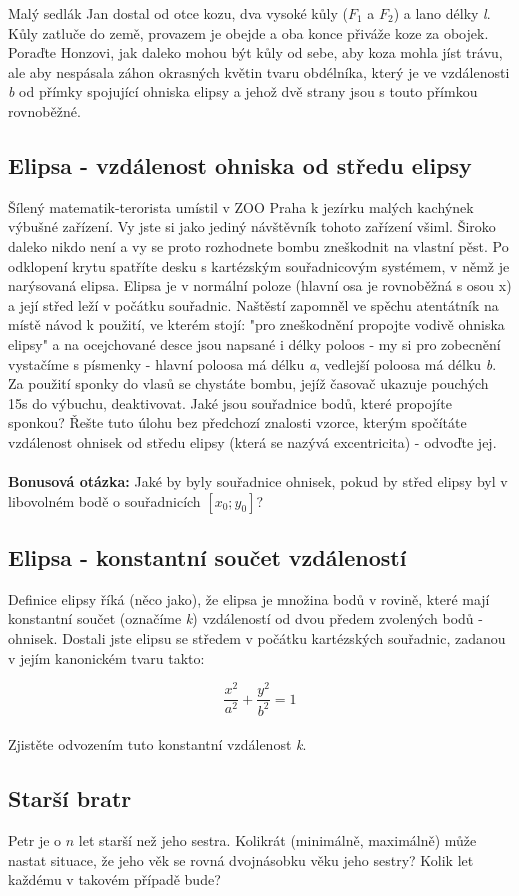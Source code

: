 \documentclass[a4paper,12pt]{article}
\begin{document}
Malý sedlák Jan dostal od otce kozu, dva vysoké kůly ($ F_1$ a $F_2 $) a lano délky \textit{l}. Kůly zatluče do země, provazem je obejde a oba konce přiváže koze za obojek. Poraďte Honzovi, jak daleko mohou být kůly od sebe, aby koza mohla jíst trávu, ale aby nespásala záhon okrasných květin tvaru obdélníka, který je ve vzdálenosti \textit{b} od přímky spojující ohniska elipsy a jehož dvě strany jsou s touto přímkou rovnoběžné.	
 
\subsection{Elipsa - vzdálenost ohniska od středu elipsy}
 
Šílený matematik-terorista umístil v ZOO Praha k jezírku malých kachýnek výbušné zařízení. Vy jste si jako jediný návštěvník tohoto zařízení všiml. Široko daleko nikdo není a vy se proto rozhodnete bombu zneškodnit na vlastní pěst. Po odklopení krytu spatříte desku s kartézským souřadnicovým systémem, v němž je narýsovaná elipsa. Elipsa je v normální poloze (hlavní osa je rovnoběžná s osou x) a její střed leží v počátku souřadnic. Naštěstí zapomněl ve spěchu atentátník na místě návod k použití, ve kterém stojí: "pro zneškodnění propojte vodivě ohniska elipsy" a na ocejchované desce jsou napsané i délky poloos - my si pro zobecnění vystačíme s písmenky - hlavní poloosa má délku \textit{a}, vedlejší poloosa má délku \textit{b}. Za použití sponky do vlasů se chystáte bombu, jejíž časovač ukazuje pouchých 15s do výbuchu, deaktivovat. Jaké jsou souřadnice bodů, které propojíte sponkou? Řešte tuto úlohu bez předchozí znalosti vzorce, kterým spočítáte vzdálenost ohnisek od středu elipsy (která se nazývá excentricita) - odvoďte jej.
\\ \\
\textbf{Bonusová otázka:} Jaké by byly souřadnice ohnisek, pokud by střed elipsy byl v libovolném bodě o souřadnicích $[x_0; y_0]$?

\newpage

\subsection{Elipsa - konstantní součet vzdáleností}

Definice elipsy říká (něco jako), že elipsa je množina bodů v rovině, které mají konstantní součet (označíme \textit{k}) vzdáleností od dvou předem zvolených bodů - ohnisek. Dostali jste elipsu se středem v počátku kartézských souřadnic, zadanou v jejím kanonickém tvaru takto:

\begin{equation*}
  \frac{x^2}{a^2} + \frac{y^2}{b^2} = 1
\end{equation*}
\\
Zjistěte odvozením tuto konstantní vzdálenost \textit{k}.
 
\subsection{Starší bratr}

Petr je o $n$ let starší než jeho sestra. Kolikrát (minimálně, maximálně) může nastat situace, že jeho věk se rovná dvojnásobku věku jeho sestry? Kolik let každému v takovém případě bude?
 
\end{document}
